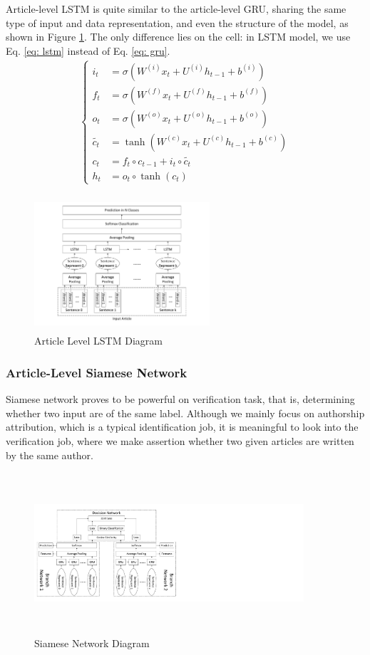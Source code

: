 \documentclass{article} %
\begin{document}
Article-level LSTM is quite similar to the article-level GRU, sharing the same type of input and data representation, and even the structure of the model, as shown in Figure \ref{fig: aLSTM}. The only difference lies on the cell: in LSTM model, we use Eq. \ref{eq: lstm} instead of Eq. \ref{eq: gru}. 
\begin{align}
\label{eq: lstm}
\begin{cases}
i_t&=  \sigma(W^{(i)}x_t + U^{(i)}h_{t - 1} + b^{(i)})\\
f_t&= \sigma(W^{(f)}x_t + U^{(f)}h_{t - 1} + b^{(f)}) \\
o_t&= \sigma(W^{(o)}x_t + U^{(o)}h_{t - 1} + b^{(o)}) \\
\tilde{c_t} &= \tanh(W^{(c)}x_t + U^{(c)} h_{t - 1} + b^{(c)}) \\
c_t&= f_t \circ c_{t - 1} + i_t \circ \tilde{c_t} \\
h_t &= o_t \circ \tanh(c_t)
\end{cases}  
\end{align}
%
\begin{figure}[H]
\centering
\includegraphics[width=65mm, height = 50mm]{figures/articleLevelLSTM.pdf} 
\caption{Article Level LSTM Diagram}
\label{fig: aLSTM}
\end{figure}
%

\subsubsection{Article-Level Siamese Network}

Siamese network proves to be powerful on verification task, that is, determining whether two input are of the same label. Although we mainly focus on authorship attribution, which is a typical identification job, it is meaningful to look into the verification job, where we make assertion whether two given articles are written by the same author. 

\begin{figure}[H]
\centering
\includegraphics[width=100mm, height = 60mm]{figures/siameseNetwork.pdf} 
\caption{Siamese Network Diagram}
\label{fig: siamese}
\end{figure}
\end{document}
